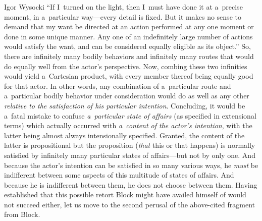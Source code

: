 \begin{artengenv}{Igor Wysocki}
{ ``If I~turned on the light, then I~must have done it at a~precise moment, in a~particular way---every detail is fixed. But it makes no sense to demand that my want be directed at an action performed at any one moment or done in some unique manner. Any one of an indefinitely large number of actions would satisfy the want, and can be considered equally eligible as its object.''} So, there are infinitely many bodily behaviors and infinitely many routes that would do equally well from the actor's perspective. Now, combing these two infinities would yield a~Cartesian product, with every member thereof being equally good for that actor. In other words, any combination of a~particular route and a~particular bodily behavior under consideration would do as well as any other \textit{relative to the satisfaction of his particular intention}. Concluding, it would be a~fatal mistake to confuse \textit{a~particular state of affairs} (as specified in extensional terms) which actually occurred with \textit{a~content of the actor's intention}, with the latter being almost always intensionally specified. Granted, the content of the latter is propositional but the proposition (\textit{that} this or that happens) is normally satisfied by infinitely many particular states of affairs---but not by only one. And because the actor's intention can be satisfied in so many various ways, he \textit{must} be indifferent between some aspects of this multitude of states of affairs. And because he is indifferent between them, he does not choose between them. Having established that this possible retort Block might have availed himself of would not succeed either, let us move to the second perusal of the above-cited fragment from Block.


\end{artengenv}
